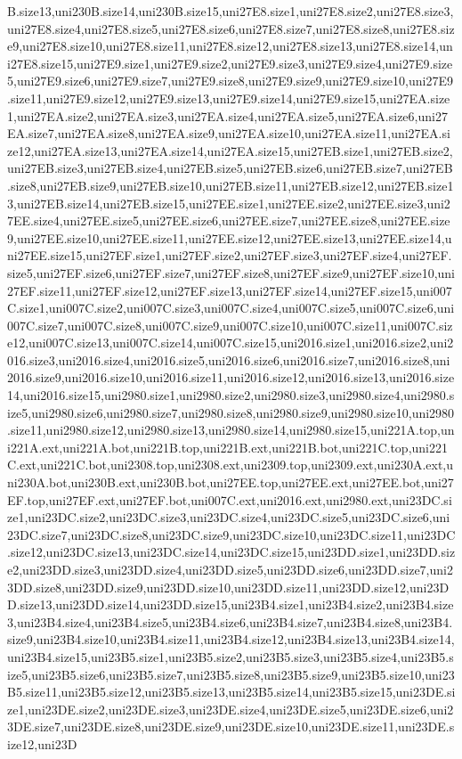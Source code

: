 B.size13,uni230B.size14,uni230B.size15,uni27E8.size1,uni27E8.size2,uni27E8.size3,uni27E8.size4,uni27E8.size5,uni27E8.size6,uni27E8.size7,uni27E8.size8,uni27E8.size9,uni27E8.size10,uni27E8.size11,uni27E8.size12,uni27E8.size13,uni27E8.size14,uni27E8.size15,uni27E9.size1,uni27E9.size2,uni27E9.size3,uni27E9.size4,uni27E9.size5,uni27E9.size6,uni27E9.size7,uni27E9.size8,uni27E9.size9,uni27E9.size10,uni27E9.size11,uni27E9.size12,uni27E9.size13,uni27E9.size14,uni27E9.size15,uni27EA.size1,uni27EA.size2,uni27EA.size3,uni27EA.size4,uni27EA.size5,uni27EA.size6,uni27EA.size7,uni27EA.size8,uni27EA.size9,uni27EA.size10,uni27EA.size11,uni27EA.size12,uni27EA.size13,uni27EA.size14,uni27EA.size15,uni27EB.size1,uni27EB.size2,uni27EB.size3,uni27EB.size4,uni27EB.size5,uni27EB.size6,uni27EB.size7,uni27EB.size8,uni27EB.size9,uni27EB.size10,uni27EB.size11,uni27EB.size12,uni27EB.size13,uni27EB.size14,uni27EB.size15,uni27EE.size1,uni27EE.size2,uni27EE.size3,uni27EE.size4,uni27EE.size5,uni27EE.size6,uni27EE.size7,uni27EE.size8,uni27EE.size9,uni27EE.size10,uni27EE.size11,uni27EE.size12,uni27EE.size13,uni27EE.size14,uni27EE.size15,uni27EF.size1,uni27EF.size2,uni27EF.size3,uni27EF.size4,uni27EF.size5,uni27EF.size6,uni27EF.size7,uni27EF.size8,uni27EF.size9,uni27EF.size10,uni27EF.size11,uni27EF.size12,uni27EF.size13,uni27EF.size14,uni27EF.size15,uni007C.size1,uni007C.size2,uni007C.size3,uni007C.size4,uni007C.size5,uni007C.size6,uni007C.size7,uni007C.size8,uni007C.size9,uni007C.size10,uni007C.size11,uni007C.size12,uni007C.size13,uni007C.size14,uni007C.size15,uni2016.size1,uni2016.size2,uni2016.size3,uni2016.size4,uni2016.size5,uni2016.size6,uni2016.size7,uni2016.size8,uni2016.size9,uni2016.size10,uni2016.size11,uni2016.size12,uni2016.size13,uni2016.size14,uni2016.size15,uni2980.size1,uni2980.size2,uni2980.size3,uni2980.size4,uni2980.size5,uni2980.size6,uni2980.size7,uni2980.size8,uni2980.size9,uni2980.size10,uni2980.size11,uni2980.size12,uni2980.size13,uni2980.size14,uni2980.size15,uni221A.top,uni221A.ext,uni221A.bot,uni221B.top,uni221B.ext,uni221B.bot,uni221C.top,uni221C.ext,uni221C.bot,uni2308.top,uni2308.ext,uni2309.top,uni2309.ext,uni230A.ext,uni230A.bot,uni230B.ext,uni230B.bot,uni27EE.top,uni27EE.ext,uni27EE.bot,uni27EF.top,uni27EF.ext,uni27EF.bot,uni007C.ext,uni2016.ext,uni2980.ext,uni23DC.size1,uni23DC.size2,uni23DC.size3,uni23DC.size4,uni23DC.size5,uni23DC.size6,uni23DC.size7,uni23DC.size8,uni23DC.size9,uni23DC.size10,uni23DC.size11,uni23DC.size12,uni23DC.size13,uni23DC.size14,uni23DC.size15,uni23DD.size1,uni23DD.size2,uni23DD.size3,uni23DD.size4,uni23DD.size5,uni23DD.size6,uni23DD.size7,uni23DD.size8,uni23DD.size9,uni23DD.size10,uni23DD.size11,uni23DD.size12,uni23DD.size13,uni23DD.size14,uni23DD.size15,uni23B4.size1,uni23B4.size2,uni23B4.size3,uni23B4.size4,uni23B4.size5,uni23B4.size6,uni23B4.size7,uni23B4.size8,uni23B4.size9,uni23B4.size10,uni23B4.size11,uni23B4.size12,uni23B4.size13,uni23B4.size14,uni23B4.size15,uni23B5.size1,uni23B5.size2,uni23B5.size3,uni23B5.size4,uni23B5.size5,uni23B5.size6,uni23B5.size7,uni23B5.size8,uni23B5.size9,uni23B5.size10,uni23B5.size11,uni23B5.size12,uni23B5.size13,uni23B5.size14,uni23B5.size15,uni23DE.size1,uni23DE.size2,uni23DE.size3,uni23DE.size4,uni23DE.size5,uni23DE.size6,uni23DE.size7,uni23DE.size8,uni23DE.size9,uni23DE.size10,uni23DE.size11,uni23DE.size12,uni23D